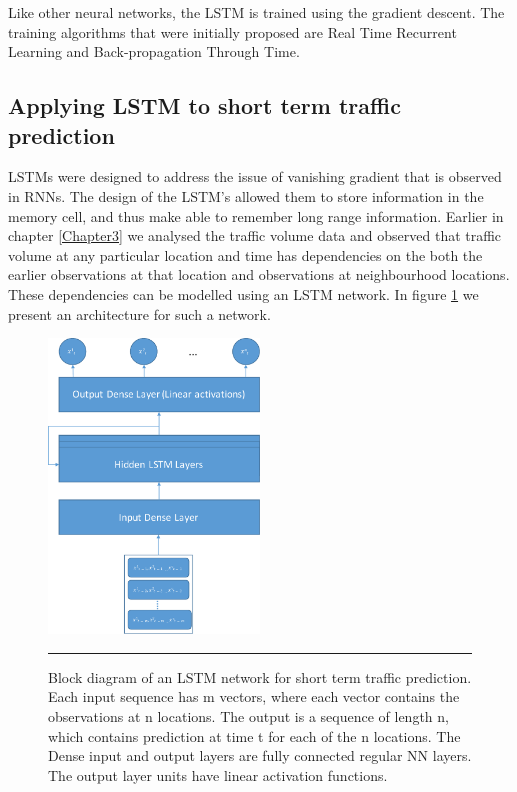 Like other neural networks, the LSTM is trained using the gradient descent. The training algorithms
that were initially proposed are Real Time Recurrent Learning and Back-propagation Through Time.

\subsection{Applying LSTM to short term traffic prediction}
LSTMs were designed to address the issue of vanishing gradient that is observed in RNNs. The design
of the LSTM's allowed them to store information in the memory cell, and thus make able to remember
long range information. Earlier in chapter \ref{Chapter3} we analysed the traffic volume data and
observed that traffic volume at any particular location and time has dependencies on the both the
earlier observations at that location and observations at neighbourhood locations. These dependencies
can be modelled using an LSTM network. In figure \ref{fig:lstmTraffiPrediction} we present an
architecture for such a network.


\begin{figure}[htbp]
  \centering
    \includegraphics[width=0.5\textwidth,height=0.5\textheight,keepaspectratio]{Figures/lstm-traffic-pred.pdf}
    \rule{35em}{0.5pt}
  \caption[Block diagram of an LSTM network for short term traffic prediction]
          {Block diagram of an LSTM network for short term traffic prediction. Each input sequence
          has m vectors, where each vector contains the observations at n locations. The output is
          a sequence of length n, which contains prediction at time t for each of the n locations. The
          Dense input and output layers are fully connected regular NN layers. The output layer units
          have linear activation functions.}
  \label{fig:lstmTraffiPrediction}
\end{figure}

